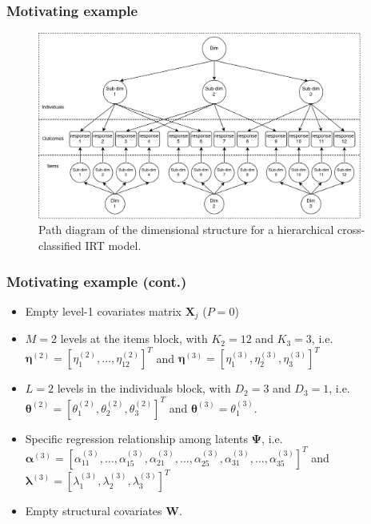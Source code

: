 \documentclass[nonav,sleutel]{beamer}
\begin{document}
	\begin{frame}
		\frametitle{Motivating example}
		\begin{figure}[h]
			\centering
			\includegraphics[width=0.95\textwidth]{instrument_design}
			\caption{Path diagram of the dimensional structure for a hierarchical cross-classified IRT model.}
			\label{fig:design}
		\end{figure}
	\end{frame}
	\begin{frame}
		\frametitle{Motivating example (cont.)}
		\begin{itemize}
			\item Empty level-1 covariates matrix $\mathbf{X}_{j}$ ($P=0$)
			\item $M=2$ levels at the items block, with $K_{2}=12$ and $K_{3}=3$, i.e. $\pmb{\eta}^{(2)} = [ \eta_{1}^{(2)}, \dots, \eta_{12}^{(2)} ]^{T}$ and $\pmb{\eta}^{(3)} = [ \eta_{1}^{(3)}, \eta_{2}^{(3)}, \eta_{3}^{(3)} ]^{T}$
			\item $L=2$ levels in the individuals block, with $D_{2}=3$ and $D_{3}=1$, i.e. $\pmb{\theta}^{(2)} = [ \theta_{1}^{(2)}, \theta_{2}^{(2)}, \theta_{3}^{(2)} ]^{T}$ and $\pmb{\theta}^{(3)} = \theta_{1}^{(3)}$.
			\item Specific regression relationship among latents $\pmb{\Psi}$, i.e.
			$ \pmb{\alpha}^{(3)} = [ \alpha_{11}^{(3)}, \dots, \alpha_{15}^{(3)}, \alpha_{21}^{(3)}, \dots, \alpha_{25}^{(3)}, \alpha_{31}^{(3)}, \dots, \alpha_{35}^{(3)} ]^{T} $ and  $ \pmb{\lambda}^{(3)} = [ \lambda_{1}^{(3)}, \lambda_{2}^{(3)}, \lambda_{3}^{(3)} ]^{T}$ 
			\item Empty structural covariates $\mathbf{W}$.
		\end{itemize}
	\end{frame}
\end{document}
